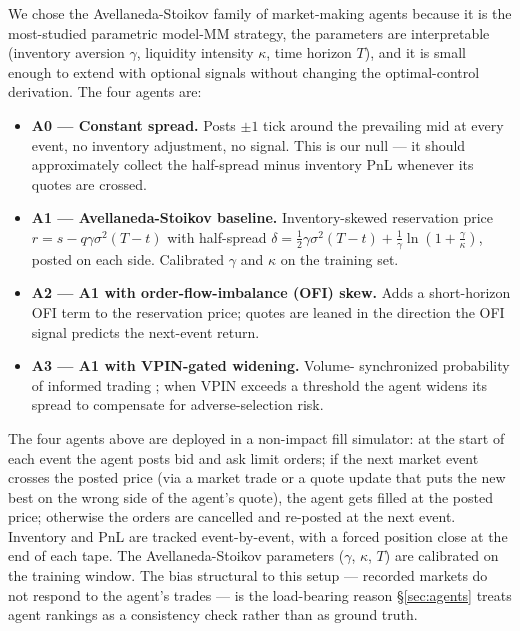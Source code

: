 \documentclass[journal]{IEEEtran}
\theoremstyle{definition}   %
\begin{document}
We chose the Avellaneda-Stoikov family of market-making agents
\cite{avellaneda2008high} because it is the most-studied parametric
model-MM strategy, the parameters are interpretable (inventory
aversion $\gamma$, liquidity intensity $\kappa$, time horizon $T$),
and it is small enough to extend with optional signals without
changing the optimal-control derivation. The four agents are:

\begin{itemize}
    \item \textbf{A0 --- Constant spread.} Posts $\pm 1$ tick around
    the prevailing mid at every event, no inventory adjustment, no
    signal. This is our null --- it should approximately collect the
    half-spread minus inventory PnL whenever its quotes are crossed.
    \item \textbf{A1 --- Avellaneda-Stoikov baseline.} Inventory-skewed
    reservation price $r = s - q\gamma\sigma^2(T - t)$ with
    half-spread $\delta = \tfrac{1}{2}\gamma\sigma^2(T - t) +
    \tfrac{1}{\gamma}\ln(1 + \tfrac{\gamma}{\kappa})$, posted on each
    side. Calibrated $\gamma$ and $\kappa$ on the training set.
    \item \textbf{A2 --- A1 with order-flow-imbalance (OFI) skew.}
    Adds a short-horizon OFI term \cite{cont2014price} to the
    reservation price; quotes are leaned in the direction the OFI
    signal predicts the next-event return.
    \item \textbf{A3 --- A1 with VPIN-gated widening.} Volume-
    synchronized probability of informed trading
    \cite{easley2012flow}; when VPIN exceeds a threshold the agent
    widens its spread to compensate for adverse-selection risk.
\end{itemize}

The four agents above are deployed in a non-impact fill simulator:
at the start of each event the agent posts bid and ask limit orders;
if the next market event crosses the posted price (via a market
trade or a quote update that puts the new best on the wrong side of
the agent's quote), the agent gets filled at the posted price;
otherwise the orders are cancelled and re-posted at the next event.
Inventory and PnL are tracked event-by-event, with a forced position
close at the end of each tape. The Avellaneda-Stoikov parameters
($\gamma$, $\kappa$, $T$) are calibrated on the training window.
The bias structural to this setup --- recorded markets do not
respond to the agent's trades --- is the load-bearing reason
\S\ref{sec:agents} treats agent rankings as a consistency check
rather than as ground truth.
\end{document}

